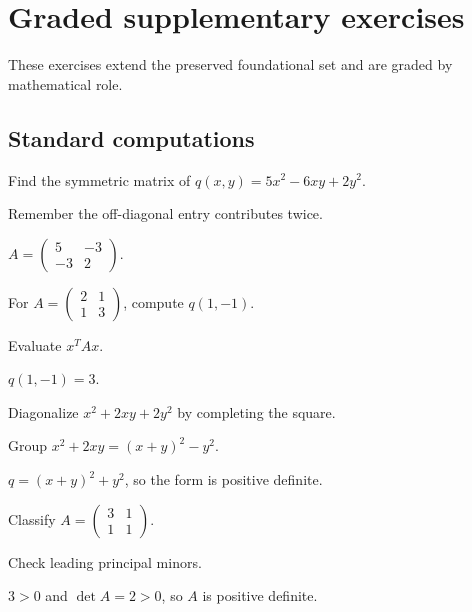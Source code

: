 \section{Graded supplementary exercises}
These exercises extend the preserved foundational set and are graded by mathematical role.

\subsection*{Standard computations}

\begin{exercise}\label{exr:i17-expand-01}
Find the symmetric matrix of \(q(x,y)=5x^2-6xy+2y^2\).
\end{exercise}
\begin{hint}
Remember the off-diagonal entry contributes twice.
\end{hint}
\begin{solution}
\(A=\begin{pmatrix}5&-3\\-3&2\end{pmatrix}\).
\end{solution}

\begin{exercise}\label{exr:i17-expand-02}
For \(A=\begin{pmatrix}2&1\\1&3\end{pmatrix}\), compute \(q(1,-1)\).
\end{exercise}
\begin{hint}
Evaluate \(x^TAx\).
\end{hint}
\begin{solution}
\(q(1,-1)=3\).
\end{solution}

\begin{exercise}\label{exr:i17-expand-03}
Diagonalize \(x^2+2xy+2y^2\) by completing the square.
\end{exercise}
\begin{hint}
Group \(x^2+2xy=(x+y)^2-y^2\).
\end{hint}
\begin{solution}
\(q=(x+y)^2+y^2\), so the form is positive definite.
\end{solution}

\begin{exercise}\label{exr:i17-expand-04}
Classify \(A=\begin{pmatrix}3&1\\1&1\end{pmatrix}\).
\end{exercise}
\begin{hint}
Check leading principal minors.
\end{hint}
\begin{solution}
\(3>0\) and \(\det A=2>0\), so \(A\) is positive definite.
\end{solution}

